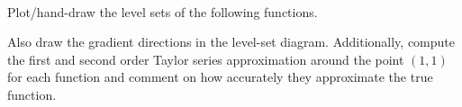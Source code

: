 \\

Plot/hand-draw the level sets of the following functions.

Also draw the gradient directions in the level-set diagram. 
Additionally, compute the first and second order Taylor series approximation around the point $(1,1)$ for each function and comment on how accurately they approximate the true function. 

\begin{enumerate}


\sol{}



\sol{}
\end{enumerate}